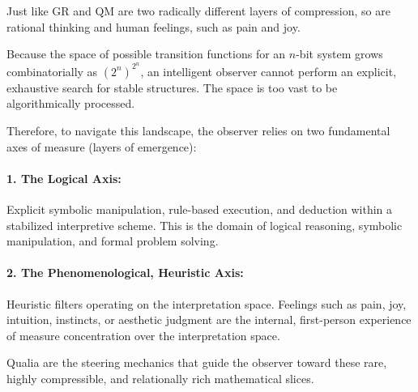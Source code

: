 Just like GR and QM are two radically different layers of compression, so are rational thinking and human feelings, such as pain and joy.

Because the space of possible transition functions for an $n$-bit system grows combinatorially as $(2^n)^{2^n}$, an intelligent observer cannot perform an explicit, exhaustive search for stable structures. The space is too vast to be algorithmically processed.

Therefore, to navigate this landscape, the observer relies on two fundamental axes of measure (layers of emergence):

\paragraph{1. The Logical Axis:} Explicit symbolic manipulation, rule-based execution, and deduction within a stabilized interpretive scheme.
This is the domain of logical reasoning, symbolic manipulation, and formal problem solving.

\paragraph{2. The Phenomenological, Heuristic Axis:} Heuristic filters operating on the interpretation space.
Feelings such as pain, joy, intuition, instincts, or aesthetic judgment are the internal, first-person experience of measure concentration over the interpretation space. 

Qualia are the steering mechanics that guide the observer toward these rare, highly compressible, and relationally rich mathematical slices.

